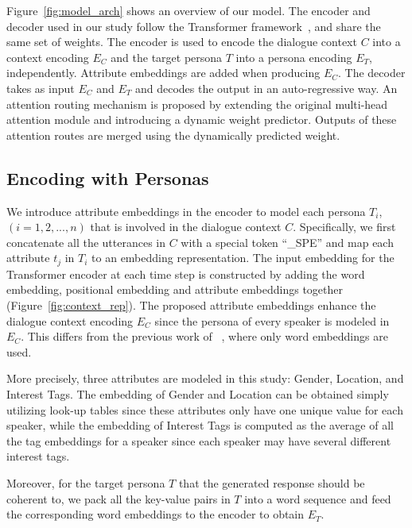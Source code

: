 \documentclass[letterpaper]{article} %
\newcommand{\citet}[1]{\citeauthor{#1} \shortcite{#1}}
\newcommand{\citep}{\cite}
\begin{document}
Figure~\ref{fig:model_arch} shows an overview of our model. The encoder and decoder used in our study follow the Transformer framework~\citep{Vaswani2017Attention}, and share the same set of weights. The encoder is used to encode the dialogue context $C$ into a context encoding $E_C$ and the target persona $T$ into a persona encoding $E_T$, independently. Attribute embeddings are added when producing $E_C$. The decoder takes as input $E_C$ and $E_T$ and decodes the output in an auto-regressive way. An attention routing mechanism is proposed by extending the original multi-head attention module and introducing a dynamic weight predictor. Outputs of these attention routes are merged using the dynamically predicted weight.

\subsection{Encoding with Personas}\label{sec:att_embed}
We introduce attribute embeddings in the encoder to model each persona $T_i$, $(i = 1, 2, ..., n)$ that is involved in the dialogue context $C$. Specifically, we first concatenate all the utterances in $C$ with a special token ``\_SPE'' and map each attribute $t_j$ in $T_i$ to an embedding representation. The input embedding for the Transformer encoder at each time step is constructed by adding the word embedding, positional embedding and attribute embeddings together (Figure~\ref{fig:context_rep}). The proposed attribute embeddings enhance the dialogue context encoding $E_C$ since the persona of every speaker is modeled in $E_C$. This differs from the previous work of~\citet{golovanov-etal-2019-large}, where only word embeddings are used.

More precisely, three attributes are modeled in this study: Gender, Location, and Interest Tags. The embedding of Gender and Location can be obtained simply utilizing look-up tables since these attributes only have one unique value for each speaker, while the embedding of Interest Tags is computed as the average of all the tag embeddings for a speaker since each speaker may have several different interest tags.

Moreover, for the target persona $T$ that the generated response should be coherent to, we pack all the key-value pairs in $T$ into a word sequence and feed the corresponding word embeddings to the encoder to obtain $E_T$.
\end{document}
